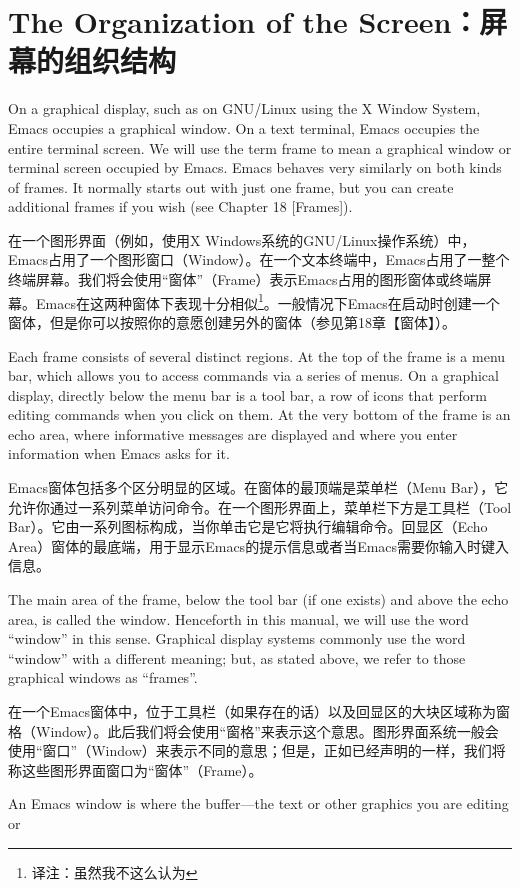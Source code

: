 \chapter{The Organization of the Screen：屏幕的组织结构}
On a graphical display, such as on GNU/Linux using the X Window System, Emacs occupies
a graphical window. On a text terminal, Emacs occupies the entire terminal screen. We
will use the term frame to mean a graphical window or terminal screen occupied by Emacs.
Emacs behaves very similarly on both kinds of frames. It normally starts out with just one
frame, but you can create additional frames if you wish (see Chapter 18 [Frames]).
\par
在一个图形界面（例如，使用X Windows系统的GNU/Linux操作系统）中，Emacs占用了一个图形窗口（Window）。在一个文本终端中，Emacs占用了一整个终端屏幕。我们将会使用“窗体”（Frame）表示Emacs占用的图形窗体或终端屏幕。Emacs在这两种窗体下表现十分相似\footnote{译注：虽然我不这么认为}。一般情况下Emacs在启动时创建一个窗体，但是你可以按照你的意愿创建另外的窗体（参见第18章【窗体】）。\par
Each frame consists of several distinct regions. At the top of the frame is a menu bar,
which allows you to access commands via a series of menus. On a graphical display, directly
below the menu bar is a tool bar, a row of icons that perform editing commands when you
click on them. At the very bottom of the frame is an echo area, where informative messages
are displayed and where you enter information when Emacs asks for it.
\par
Emacs窗体包括多个区分明显的区域。在窗体的最顶端是菜单栏（Menu Bar），它允许你通过一系列菜单访问命令。在一个图形界面上，菜单栏下方是工具栏（Tool Bar）。它由一系列图标构成，当你单击它是它将执行编辑命令。回显区（Echo Area）窗体的最底端，用于显示Emacs的提示信息或者当Emacs需要你输入时键入信息。\par
The main area of the frame, below the tool bar (if one exists) and above the echo area, is
called the window. Henceforth in this manual, we will use the word “window” in this sense.
Graphical display systems commonly use the word “window” with a different meaning; but,
as stated above, we refer to those graphical windows as “frames”.
\par
在一个Emacs窗体中，位于工具栏（如果存在的话）以及回显区的大块区域称为窗格（Window）。此后我们将会使用“窗格”来表示这个意思。图形界面系统一般会使用“窗口”（Window）来表示不同的意思；但是，正如已经声明的一样，我们将称这些图形界面窗口为“窗体”（Frame）。\par
An Emacs window is where the buffer—the text or other graphics you are editing or
